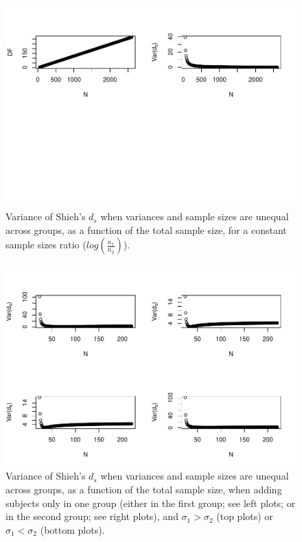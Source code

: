 \documentclass[
  man]{apa6}
\begin{document}
\begin{figure}
\centering
\includegraphics{Theoretical-Variance-of-all-estimators-as-a-function-of-population-parameters_files/figure-latex/varshiehhetunbalNsize2-1.pdf}
\caption{\label{fig:varshiehhetunbalNsize2}Variance of Shieh's \(d_s\) when variances and sample sizes are unequal across groups, as a function of the total sample size, for a constant sample sizes ratio (\(log\left(\frac{n_1}{n_2} \right)\)).}
\end{figure}

\begin{figure}
\centering
\includegraphics{Theoretical-Variance-of-all-estimators-as-a-function-of-population-parameters_files/figure-latex/varshiehhetunbalNsize4-1.pdf}
\caption{\label{fig:varshiehhetunbalNsize4}Variance of Shieh's \(d_s\) when variances and sample sizes are unequal across groups, as a function of the total sample size, when adding subjects only in one group (either in the first group; see left plots; or in the second group; see right plots), and \(\sigma_1 > \sigma_2\) (top plots) or \(\sigma_1 < \sigma_2\) (bottom plots).}
\end{figure}
\end{document}
